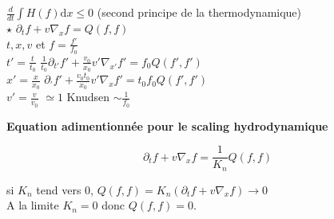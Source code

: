 \documentclass[12pt,a4paper]{article}
\begin{document}
$\frac d{dt} \displaystyle\int H(f) \mathrm dx \leq 0$ (second principe de la thermodynamique)\\

$\star$ $\partial_t f + v\nabla_x f = Q(f,f)$ \\
$t,x,v$ et $f = \frac{f'}{f_0}$\\
$t' = \frac t{t_0}$ \hspace{1cm} $\frac1{t_0} \partial_{t'} f' + \frac{v_0}{x_0}v'\nabla_{x'} f' = f_0 Q(f',f')$ \\
$x' = \frac{x}{x_0}$ \hspace{1cm} $\partial_{'}f' + \frac{v_0t_0}{x_0} v' \nabla_x f' = t_0 f_0 Q(f',f')$\\
$v' = \frac v{v_0}$ \hspace{1cm} $\simeq 1$ Knudsen $\sim \frac 1{f_0}$

\newpage

\textbf{Equation adimentionnée pour le scaling hydrodynamique}

\[
\partial_t f + v \nabla_x f = \frac 1{K_n} Q(f,f)
\]

si $K_n$ tend vers 0, $Q(f,f) = K_n\left(\partial_t f + v\nabla_x f\right)\to 0$\\
A la limite $K_n = 0$ donc $Q(f,f) = 0$.\\
\end{document}
